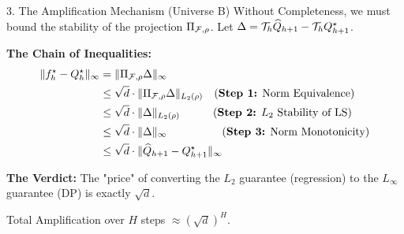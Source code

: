 \documentclass[aspectratio=169]{beamer}
\begin{document}
\begin{frame}{3. The Amplification Mechanism (Universe B)}
    Without Completeness, we must bound the stability of the projection $\Pi_{\mathcal{F},\rho}$.
    Let $\Delta = \mathcal{T}_h \widehat{Q}_{h+1} - \mathcal{T}_h Q^\star_{h+1}$.
    
    \vspace{0.2cm}
    
    \textbf{The Chain of Inequalities:}
    \begin{align*}
        \|f^\star_h - Q^\star_h\|_\infty &= \|\Pi_{\mathcal{F},\rho} \Delta\|_\infty \\
        &\le \sqrt{d} \cdot \|\Pi_{\mathcal{F},\rho} \Delta\|_{L_2(\rho)} \quad \text{(\textbf{Step 1:} Norm Equivalence)} \\
        &\le \sqrt{d} \cdot \|\Delta\|_{L_2(\rho)} \quad \quad \quad \text{(\textbf{Step 2:} $L_2$ Stability of LS)} \\
        &\le \sqrt{d} \cdot \|\Delta\|_\infty \quad \quad \quad \quad \quad \text{(\textbf{Step 3:} Norm Monotonicity)} \\
        &\le \sqrt{d} \cdot \|\widehat{Q}_{h+1} - Q^\star_{h+1}\|_\infty
    \end{align*}

    \vspace{0.1cm}
    
    \textbf{The Verdict:}
    The "price" of converting the $L_2$ guarantee (regression) to the $L_\infty$ guarantee (DP) is exactly $\sqrt{d}$.
    
    \centering
    \alert{Total Amplification over $H$ steps $\approx (\sqrt{d})^H$.}
\end{frame}
\end{document}
